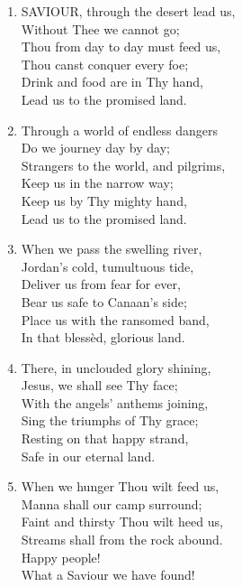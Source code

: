 \documentclass[11pt,a4paper]{article}
\begin{document}
\begin{enumerate}
    \item SAVIOUR, through the desert lead us, \\
        Without Thee we cannot go; \\
        Thou from day to day must feed us, \\
        Thou canst conquer every foe; \\
        Drink and food are in Thy hand, \\
        Lead us to the promised land.

    \item Through a world of endless dangers \\
        Do we journey day by day; \\
        Strangers to the world, and pilgrims, \\
        Keep us in the narrow way; \\
        Keep us by Thy mighty hand, \\
        Lead us to the promised land.

    \item When we pass the swelling river, \\
        Jordan's cold, tumultuous tide, \\
        Deliver us from fear for ever, \\
        Bear us safe to Canaan's side; \\
        Place us with the ransomed band, \\
        In that bless\`ed, glorious land.

    \item There, in unclouded glory shining, \\
        Jesus, we shall see Thy face; \\
        With the angels' anthems joining, \\
        Sing the triumphs of Thy grace; \\
        Resting on that happy strand, \\
        Safe in our eternal land.

    \item When we hunger Thou wilt feed us, \\
        Manna shall our camp surround; \\
        Faint and thirsty Thou wilt heed us, \\
        Streams shall from the rock abound. \\
        Happy people! \\
        What a Saviour we have found!

\end{enumerate}
\end{document}
